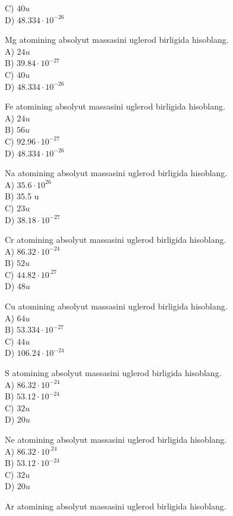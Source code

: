 C) $40 u$\\
D) $48.334 \cdot 10^{-26}$
  \item Mg atomining absolyut massasini uglerod birligida hisoblang.\\
A) $24 u$\\
B) $39.84 \cdot 10^{-27}$\\
C) $40 u$\\
D) $48.334 \cdot 10^{-26}$
  \item Fe atomining absolyut massasini uglerod birligida hisoblang.\\
A) $24 u$\\
B) $56 u$\\
C) $92.96 \cdot 10^{-27}$\\
D) $48.334 \cdot 10^{-26}$
  \item Na atomining absolyut massasini uglerod birligida hisoblang.\\
A) $35.6 \cdot 10^{26}$\\
B) 35.5 u\\
C) $23 u$\\
D) $38.18 \cdot 10^{-27}$
  \item Cr atomining absolyut massasini uglerod birligida hisoblang.\\
A) $86.32 \cdot 10^{-24}$\\
B) $52 u$\\
C) $44.82 \cdot 10^{.27}$\\
D) $48 u$
  \item Cu atomining absolyut massasini uglerod birligida hisoblang.\\
A) $64 u$\\
B) $53.334 \cdot 10^{-27}$\\
C) $44 u$\\
D) $106.24 \cdot 10^{-24}$
  \item S atomining absolyut massasini uglerod birligida hisoblang.\\
A) $86.32 \cdot 10^{-24}$\\
B) $53.12 \cdot 10^{-24}$\\
C) $32 u$\\
D) $20 u$
  \item Ne atomining absolyut massasini uglerod birligida hisoblang.\\
A) $86.32 \cdot 10^{.24}$\\
B) $53.12 \cdot 10^{-24}$\\
C) $32 u$\\
D) $20 u$
  \item Ar atomining absolyut massasini uglerod birligida hisoblang.\\
